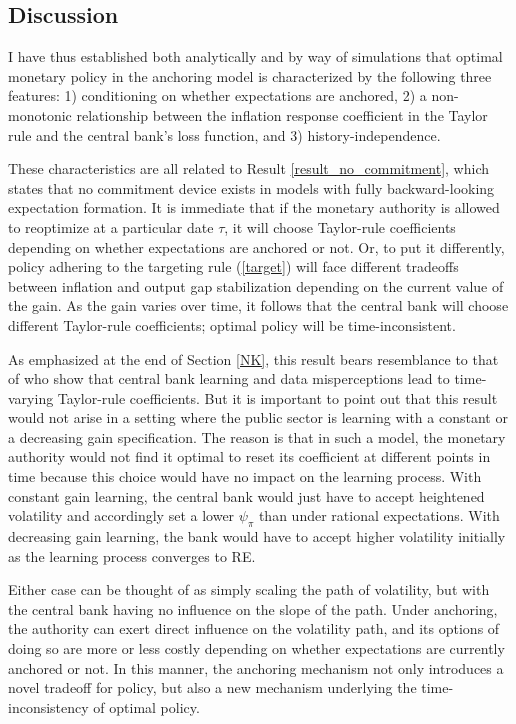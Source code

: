 \documentclass[11pt]{article}
\renewcommand{\[}{\begin{equation}}
\renewcommand{\]}{\end{equation}}
\begin{document}
\subsection{Discussion}\label{discussion_results}

I have thus established both analytically and by way of simulations that optimal monetary policy in the anchoring model is characterized by the following three features: 1) conditioning on whether expectations are anchored, 2) a non-monotonic relationship between the inflation response coefficient in the Taylor rule and the central bank's loss function, and 3) history-independence.

These characteristics are all related to Result \ref{result_no_commitment}, which states that no commitment device exists in models with fully backward-looking expectation formation. It is immediate that if the monetary authority is allowed to reoptimize at a particular date $\tau$, it will choose Taylor-rule coefficients depending on whether expectations are anchored or not. Or, to put it differently, policy adhering to the targeting rule (\ref{target}) will face different tradeoffs between inflation and output gap stabilization depending on the current value of the gain. As the gain varies over time, it follows that the central bank will choose different Taylor-rule coefficients; optimal policy will be time-inconsistent. 

As emphasized at the end of Section \ref{NK}, this result bears resemblance to that of \cite{LUBIK201685} who show that central bank learning and data misperceptions lead to time-varying Taylor-rule coefficients. But it is important to point out that this result would not arise in a setting where the public sector is learning with a constant or a decreasing gain specification. The reason is that in such a model, the monetary authority would not find it optimal to reset its coefficient at different points in time because this choice would have no impact on the learning process. With constant gain learning, the central bank would just have to accept heightened volatility and accordingly set a lower $\psi_{\pi}$ than under rational expectations. With decreasing gain learning, the bank would have to accept higher volatility initially as the learning process converges to RE. 

Either case can be thought of as simply scaling the path of volatility, but with the central bank having no influence on the slope of the path. Under anchoring, the authority can exert direct influence on the volatility path, and its options of doing so are more or less costly depending on whether expectations are currently anchored or not. In this manner, the anchoring mechanism not only introduces a novel tradeoff for policy, but also a new mechanism underlying the time-inconsistency of optimal policy. 
\end{document}
